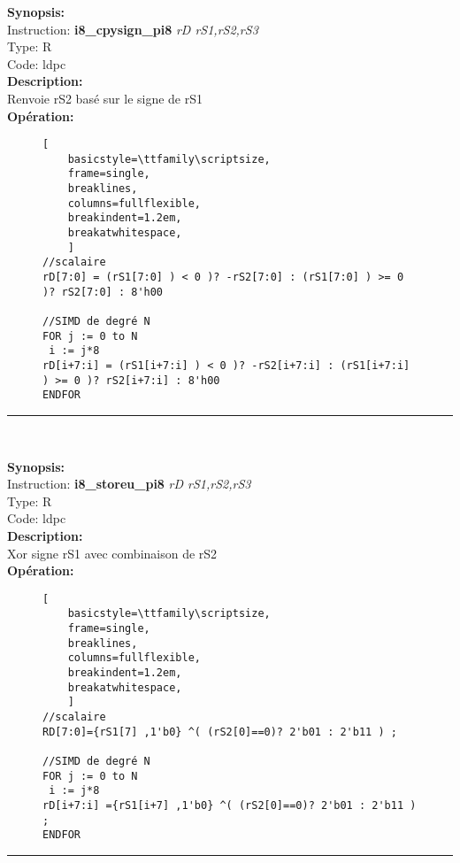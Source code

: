 {\scriptsize
\textbf{Synopsis:}\\
Instruction: \textbf{i8\_cpysign\_pi8 } \textit{rD rS1,rS2,rS3}\\
Type: R\\
Code: ldpc\\
\textbf{Description:}\\
Renvoie rS2 basé sur le signe de rS1 \\
\textbf{Opération:}\\
    \begin{figure}[H]
    \begin{lstlisting}[
    basicstyle=\ttfamily\scriptsize,
    frame=single,
    breaklines,
    columns=fullflexible,
    breakindent=1.2em,
    breakatwhitespace,
    ]
//scalaire
rD[7:0] = (rS1[7:0] ) < 0 )? -rS2[7:0] : (rS1[7:0] ) >= 0 )? rS2[7:0] : 8'h00
    
//SIMD de degré N
FOR j := 0 to N    
 i := j*8    
rD[i+7:i] = (rS1[i+7:i] ) < 0 )? -rS2[i+7:i] : (rS1[i+7:i] ) >= 0 )? rS2[i+7:i] : 8'h00
ENDFOR
\end{lstlisting}
\end{figure}
}
\rule{8cm}{0.4pt}\\
{\scriptsize
\textbf{Synopsis:}\\
Instruction: \textbf{i8\_storeu\_pi8 } \textit{rD rS1,rS2,rS3}\\
Type: R\\
Code: ldpc\\
\textbf{Description:}\\
Xor signe rS1 avec combinaison de rS2\\
\textbf{Opération:}\\
    \begin{figure}[H]
    \begin{lstlisting}[
    basicstyle=\ttfamily\scriptsize,
    frame=single,
    breaklines,
    columns=fullflexible,
    breakindent=1.2em,
    breakatwhitespace,
    ]
//scalaire
RD[7:0]={rS1[7] ,1'b0} ^( (rS2[0]==0)? 2'b01 : 2'b11 ) ;
    
//SIMD de degré N
FOR j := 0 to N    
 i := j*8    
rD[i+7:i] ={rS1[i+7] ,1'b0} ^( (rS2[0]==0)? 2'b01 : 2'b11 ) ;
ENDFOR
\end{lstlisting}
\end{figure}
}
\rule{8cm}{0.4pt}\\

